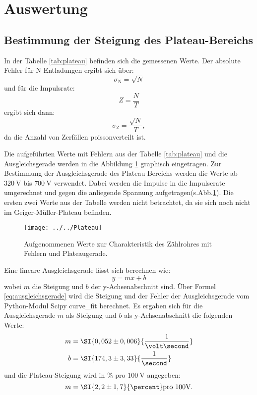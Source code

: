 \section{Auswertung}
\label{sec:Auswertung}

\subsection{Bestimmung der Steigung des Plateau-Bereichs}

In der Tabelle \ref{tab:plateau} befinden sich die gemessenen Werte. Der absolute Fehler für N Entladungen ergibt sich über:
\begin{equation}
\label{eqn:absoluterfehler}
\sigma_\text{N} = \sqrt{N}
\end{equation}
und für die Impulsrate:
\begin{equation}
Z = \frac{N}{T}
\end{equation} 
ergibt sich dann:
\begin{equation}
\label{eq:sigmaz}
\sigma_\text{Z} = \frac{\sqrt{N}}{T},
\end{equation}
da die Anzahl von Zerfällen poissonverteilt ist. 

Die aufgeführten Werte mit Fehlern aus der Tabelle \ref{tab:plateau} und die Ausgleichsgerade werden in die Abbildung \ref{fig:plateau} graphisch eingetragen. Zur Bestimmung der Ausgleichsgerade des Plateau-Bereichs werden die Werte ab $\SI{320}{\volt}$ bis $\SI{700}{\volt}$ verwendet. Dabei werden die Impulse in die Impulserate umgerechnet und gegen die anliegende Spannung aufgetragen(s.Abb.\ref{fig:plateau}). Die ersten zwei Werte aus der Tabelle werden nicht betrachtet, da sie sich noch nicht im Geiger-Müller-Plateau befinden.

\begin{figure}[h!]
	\centering
	\texttt{[image: ../../Plateau]}
	\caption{Aufgenommenen Werte zur Charakteristik des Zählrohres mit Fehlern und Plateaugerade.}
	\label{fig:plateau}
\end{figure}

Eine lineare Ausgleichsgerade lässt sich berechnen wie:
\begin{equation}
\label{eq:ausgleichsgerade}
y = mx + b
\end{equation}
wobei $m$ die Steigung und $b$ der y-Achsenabschnitt sind. Über Formel \ref{eq:ausgleichsgerade} wird die Steigung und der Fehler der Ausgleichsgerade vom Python-Modul Scipy curve\_fit berechnet.
Es ergaben sich für die Ausgleichsgerade $m$ als Steigung und $b$ als y-Achsenabschnitt die folgenden Werte:
\begin{align*}
m &= \SI{0,052 \pm 0,006}{\frac{1}{\volt\second}} \\
b &= \SI{174,3 \pm 3,33}{\frac{1}{\second}}
\end{align*}
und die Plateau-Steigung wird in $\si{\percent}$ pro $\SI{100}{\volt}$ angegeben:
\begin{equation*}
m = \SI{2,2 \pm 1,7}{\percent} \text{pro 100V}.
\end{equation*}

